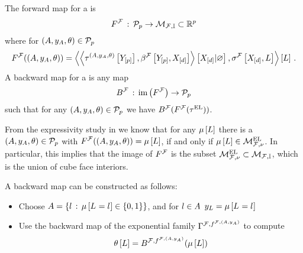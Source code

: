 \begin{definition}
    The forward map for a \HybridLogicNetwork{} is
    \begin{align*}
        F^{\mathcal{F}}\,:\, \mathcal{P}_{p}
        \rightarrow \mathcal{M}_{\mathcal{F},\mathbb{I}} \subset \mathbb{R}^{p}
    \end{align*}
    where for $(A,y_{A},\theta)\in\mathcal{P}_{p}$
    \begin{align*}
        F^{\mathcal{F}}((A,y_{A},\theta))
        = \left\langle 
            \left\langle \tau^{(A,y_{A},\theta)}\left[Y_{[p]}\right],\beta^{\mathcal{F}}\left[Y_{[p]},X_{[d]}\right]\right\rangle \left[ X_{[d]} | \varnothing \right]
            ,\sigma^{\mathcal{F}}\left[X_{[d]},L\right]\right\rangle \left[ L \right] \, .
    \end{align*}
    A backward map for a \HybridLogicNetwork{} is any map
    \begin{align*}
        B^{\mathcal{F}}\,:\, \mathrm{im}\left(F^{\mathcal{F}}\right) \rightarrow \mathcal{P}_{p}
    \end{align*}
    such that for any $(A,y_{A},\theta)\in\mathcal{P}_{p}$ we have $B^{\mathcal{F}}(F^{\mathcal{F}}(\tau^{\mathrm{EL}}))$.
\end{definition}

From the expressivity study in  we know that for any $\mu\left[L\right]$ there is a $(A,y_{A},\theta)\in\mathcal{P}_{p}$ with $F^{\mathcal{F}}((A,y_{A},\theta))=\mu\left[L\right]$, if and only if $\mu\left[L\right]\in\mathcal{M}^{\mathrm{EL}}_{\mathcal{F},\nu}$.
In particular, this implies that the image of $F^{\mathcal{F}}$ is the subset $\mathcal{M}^{\mathrm{EL}}_{\mathcal{F},\nu}\subset\mathcal{M}_{\mathcal{F},\mathbb{I}}$, which is the union of cube face interiors.

A backward map can be constructed as follows:
\begin{itemize}
    \item Choose $A=\{l\,:\,\mu\left[L_{}=l_{}\right]\in\{0,1\}\}$, and for $l\in A$ $y_{L}=\mu\left[L_{}=l_{}\right]$
    \item Use the backward map of the exponential family $\Gamma^{\mathcal{F},f^{\mathcal{F},(A,y_{A})}}$ to compute
    \begin{align*}
        \theta\left[L\right] = B^{\mathcal{F},f^{\mathcal{F},(A,y_{A})}}(\mu\left[L\right])
    \end{align*}
\end{itemize}


